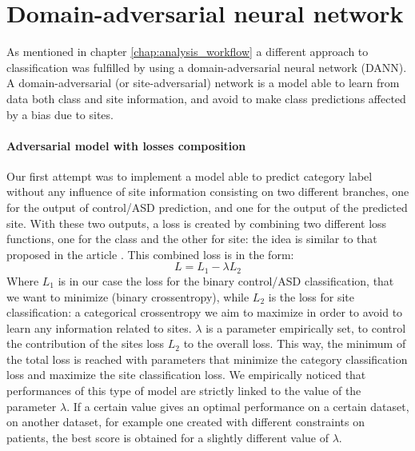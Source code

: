 \documentclass[11pt]{report}
\begin{document}
\newpage
\section{Domain-adversarial neural network}\hfill

As mentioned in chapter \ref{chap:analysis_workflow} a different approach to classification was fulfilled by using a domain-adversarial neural network (DANN).
A domain-adversarial (or site-adversarial) network is a model able to learn from data both class and site information, and avoid to make class predictions affected by a bias due to sites.


\paragraph{Adversarial model with losses composition}\hfill

\noindent Our first attempt was to implement a model able to predict category label without any influence of site information consisting on two different branches, one for the output of control/ASD prediction, and one for the output of the predicted site.
With these two outputs, a loss is created by combining two different loss functions, one for the class and the other for site: the idea is similar to that proposed in the article \cite{guan2021}.
This combined loss is in the form:
\begin{equation}
L = L_1 - \lambda L_2
\end{equation}
Where $L_1$  is in our case the loss for the binary control/ASD classification, that we want to minimize (binary crossentropy), while $L_2$ is the loss for site classification: a categorical crossentropy we aim to maximize in order to avoid to learn any information related to sites.
$\lambda $ is a parameter empirically set, to control the contribution of the sites loss $L_2$ to the overall loss.
This way, the minimum of the total loss is reached with parameters that minimize the category classification loss and maximize the site classification loss.
We empirically noticed that performances of this type of model are strictly linked to the value of the parameter $\lambda$.
If a certain value gives an optimal performance on a certain dataset, on another dataset, for example one created with different constraints on patients, the best score is obtained for a slightly different value of $\lambda$.
\end{document}
